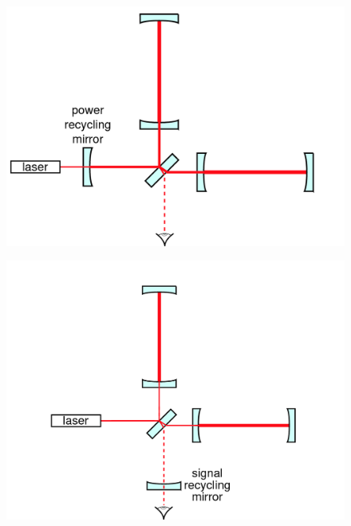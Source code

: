 \documentclass{article}
\begin{document}
\begin{figure}[]
\begin{center}
\includegraphics[width=1\columnwidth]{./figures/fig6a/fig6a}
\caption{ \protect}
\end{center}
\end{figure}


\begin{figure}[]
\begin{center}
\includegraphics[width=1\columnwidth]{./figures/fig6b/fig6b}
\caption{ \protect}
\end{center}
\end{figure}


\end{document}
